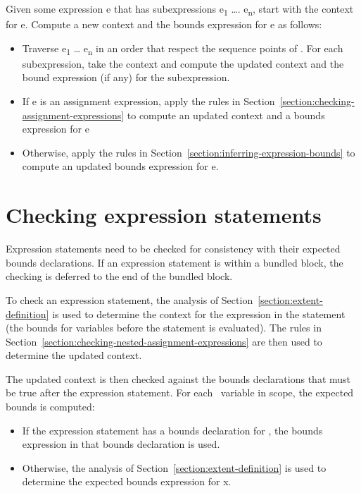 Given some expression e that has subexpressions e\textsubscript{1}
\ldots{}. e\textsubscript{n}, start with the context for e. Compute a
new context and the bounds expression for e as follows:

\begin{itemize}
\item
  Traverse e\textsubscript{1} \ldots{} e\textsubscript{n} in an order
  that respect the sequence points of \cite{ISO2011}. For each subexpression, take the
  context and compute the updated context and the bound expression (if
  any) for the subexpression.
\item
  If e is an assignment expression, apply the rules in 
  Section~\ref{section:checking-assignment-expressions} to
  compute an updated context and a bounds expression for e
\item
  Otherwise, apply the rules in Section~\ref{section:inferring-expression-bounds}
  to compute an updated bounds
  expression for e.
\end{itemize}

\section{Checking expression statements}
\label{section:checking-expression-statements}

Expression statements need to be checked for consistency with their
expected bounds declarations. If an expression statement is within a
bundled block, the checking is deferred to the end of the bundled block.

To check an expression statement, the analysis of 
Section~\ref{section:extent-definition} is used
to determine the context for the expression in the statement (the bounds
for variables before the statement is evaluated). The rules in 
Section~\ref{section:checking-nested-assignment-expressions}
are then used to determine the updated context.

The updated context is then checked against the bounds declarations that
must be true after the expression statement. For each
\arrayptr\ variable  in scope, the expected bounds is
computed:

\begin{itemize}
\item
  If the expression statement has a bounds declaration for , the
  bounds expression in that bounds declaration is used.
\item
  Otherwise, the analysis of Section~\ref{section:extent-definition}
  is used to determine the
  expected bounds expression for x.
\end{itemize}

